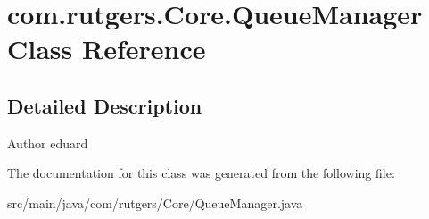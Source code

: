 \hypertarget{classcom_1_1rutgers_1_1Core_1_1QueueManager}{}\section{com.\+rutgers.\+Core.\+Queue\+Manager Class Reference}
\label{classcom_1_1rutgers_1_1Core_1_1QueueManager}


\subsection{Detailed Description}
\begin{DoxyAuthor}{Author}
eduard 
\end{DoxyAuthor}


The documentation for this class was generated from the following file\+:\begin{DoxyCompactItemize}
\item 
src/main/java/com/rutgers/\+Core/Queue\+Manager.\+java\end{DoxyCompactItemize}
